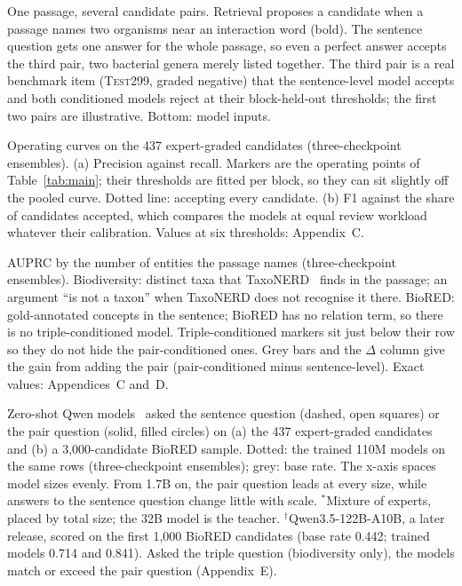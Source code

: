 
\caption{One passage, several candidate pairs. Retrieval proposes a candidate when a passage names two organisms near an interaction word (bold). The sentence question gets one answer for the whole passage, so even a perfect answer accepts the third pair, two bacterial genera merely listed together. The third pair is a real benchmark item (\textsc{Test}299, graded negative) that the sentence-level model accepts and both conditioned models reject at their block-held-out thresholds; the first two pairs are illustrative. Bottom: model inputs.}

\caption{Operating curves on the 437 expert-graded candidates (three-checkpoint ensembles). (a) Precision against recall. Markers are the operating points of Table~\ref{tab:main}; their thresholds are fitted per block, so they can sit slightly off the pooled curve. Dotted line: accepting every candidate. (b) F1 against the share of candidates accepted, which compares the models at equal review workload whatever their calibration. Values at six thresholds: Appendix~C.}

\caption{AUPRC by the number of entities the passage names (three-checkpoint ensembles). Biodiversity: distinct taxa that TaxoNERD~\citep{TAXONERD-KEY} finds in the passage; an argument ``is not a taxon'' when TaxoNERD does not recognise it there. BioRED: gold-annotated concepts in the sentence; BioRED has no relation term, so there is no triple-conditioned model. Triple-conditioned markers sit just below their row so they do not hide the pair-conditioned ones. Grey bars and the $\Delta$ column give the gain from adding the pair (pair-conditioned minus sentence-level). Exact values: Appendices~C and~D.}

\caption{Zero-shot Qwen models~\citep{QWEN-KEY} asked the sentence question (dashed, open squares) or the pair question (solid, filled circles) on (a) the 437 expert-graded candidates and (b) a 3,000-candidate BioRED sample. Dotted: the trained 110M models on the same rows (three-checkpoint ensembles); grey: base rate. The x-axis spaces model sizes evenly. From 1.7B on, the pair question leads at every size, while answers to the sentence question change little with scale. $^*$Mixture of experts, placed by total size; the 32B model is the teacher. $^\dagger$Qwen3.5-122B-A10B, a later release, scored on the first 1,000 BioRED candidates (base rate 0.442; trained models 0.714 and 0.841). Asked the triple question (biodiversity only), the models match or exceed the pair question (Appendix~E).}
